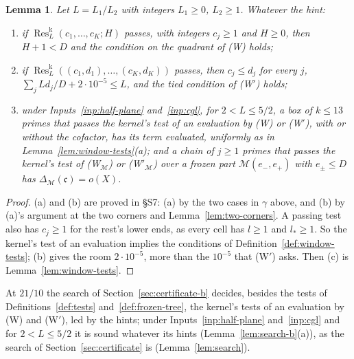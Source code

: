 \documentclass[11pt]{article}
\newtheorem{lemma}[theorem]{Lemma}
\theoremstyle{definition}
\begin{document}
\begin{lemma}\label{lem:window-kernel}
Let $L = L_1/L_2$ with integers $L_1 \ge 0$, $L_2 \ge 1$. Whatever the hint:
\begin{enumerate}
\item[(a)] if $\operatorname{Res}^{\mathrm k}_L(c_1, \dots, c_K; H)$ passes, with integers $c_j \ge 1$ and $H \ge 0$,
  then $H + 1 < D$ and the condition on the quadrant of (W) holds;
\item[(b)] if $\operatorname{Res}^{\mathrm k}_L((c_1, d_1), \dots, (c_K, d_K))$ passes, then $c_j \le d_j$ for every
  $j$, $\sum_j Ld_j/D + 2 \cdot 10^{-5} \le L$, and the tied condition of (W$'$) holds;
\item[(c)] under Inputs~\ref{inp:half-plane} and~\ref{inp:cgl}, for $2 < L \le 5/2$, a box of $k \le 13$ primes that
passes the kernel's test of an evaluation by (W) or
  (W$'$), with or without the cofactor, has its term evaluated, uniformly as in Lemma~\ref{lem:window-tests}(a); and a
  chain of $j \ge 1$ primes that passes the kernel's test of (W$_{\mathcal M}$) or (W$'_{\mathcal M}$) over a frozen
  part $\mathcal M(e_-, e_+)$ with $e_\pm \le D$ has $\Delta_{\mathcal M}(\mathfrak c) = o(X)$.
\end{enumerate}
\end{lemma}

\begin{proof}
(a) and (b) are proved in \S S7: (a) by the two cases in $\gamma$ above, and (b) by (a)'s argument at the two corners
and Lemma~\ref{lem:two-corners}. A passing test also has $c_j \ge 1$ for the rest's lower ends, as every cell has $l
\ge 1$ and $l_* \ge 1$. So the kernel's test of an evaluation implies the conditions of
Definition~\ref{def:window-tests}; (b) gives the room $2 \cdot 10^{-5}$, more than the $10^{-5}$ that (W$'$) asks.
Then (c) is Lemma~\ref{lem:window-tests}.
\end{proof}

At $21/10$ the search of Section~\ref{sec:certificate-b} decides, besides the tests of
Definitions~\ref{def:tests} and~\ref{def:frozen-tree}, the kernel's tests of an evaluation by (W) and (W$'$), led by
the hints; under Inputs~\ref{inp:half-plane}
and~\ref{inp:cgl} and for $2 < L \le 5/2$ it is sound whatever its hints (Lemma~\ref{lem:search-b}(a)), as the search
of Section~\ref{sec:certificate} is (Lemma~\ref{lem:search}).
\end{document}
